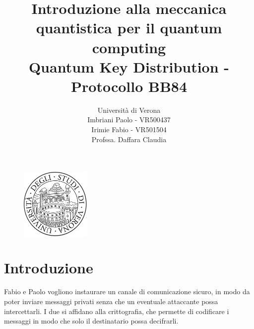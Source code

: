 \documentclass[a4paper]{article}
\begin{document}
\title{Introduzione alla meccanica quantistica per il quantum computing\\[1ex]
\large Quantum Key Distribution - Protocollo BB84
}

\author{
\vspace{0.8cm}
Università di Verona\\
Imbriani Paolo - VR500437\\
Irimie Fabio - VR501504\\[8ex]
Profssa. Daffara Claudia
}

\begin{figure}
    \centering
    \includegraphics[width=0.3\textwidth]{UniversityofVerona.png}
\end{figure}

\maketitle 

\pagebreak

\tableofcontents

\pagebreak

\section{Introduzione}
Fabio e Paolo vogliono instaurare un canale di comunicazione sicuro, in modo da poter
inviare messaggi privati senza che un eventuale attaccante possa intercettarli.
I due si affidano alla crittografia, che permette di codificare i messaggi in modo che
solo il destinatario possa decifrarli.
\end{document}
